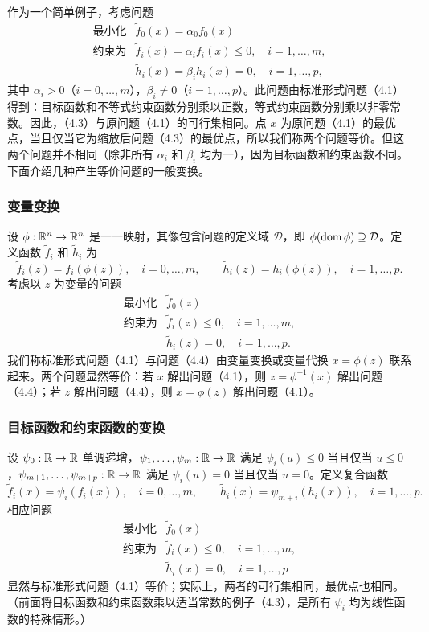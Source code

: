 作为一个简单例子，考虑问题
\begin{equation}
\begin{array}{ll}
\text{最小化}&\widetilde f_0(x)=\alpha_0f_0(x)\\
\text{约束为}&\widetilde f_i(x)=\alpha_if_i(x)\le0,\quad i=1,\ldots,m,\\
&\widetilde h_i(x)=\beta_ih_i(x)=0,\quad i=1,\ldots,p,
\end{array}\tag{4.3}
\end{equation}
其中 $\alpha_i>0$（$i=0,\ldots,m$），$\beta_i\ne0$（$i=1,\ldots,p$）。此问题由标准形式问题（4.1）得到：目标函数和不等式约束函数分别乘以正数，等式约束函数分别乘以非零常数。因此，（4.3）与原问题（4.1）的可行集相同。点 $x$ 为原问题（4.1）的最优点，当且仅当它为缩放后问题（4.3）的最优点，所以我们称两个问题等价。但这两个问题并不相同（除非所有 $\alpha_i$ 和 $\beta_i$ 均为一），因为目标函数和约束函数不同。下面介绍几种产生等价问题的一般变换。

\subsubsection*{变量变换}
设 $\phi:\mathbb R^n\to\mathbb R^n$ 是一一映射，其像包含问题的定义域 $\mathcal D$，即 $\phi(\operatorname{dom}\phi)\supseteq\mathcal D$。定义函数 $\widetilde f_i$ 和 $\widetilde h_i$ 为
\[
\widetilde f_i(z)=f_i(\phi(z)),\quad i=0,\ldots,m,\qquad
\widetilde h_i(z)=h_i(\phi(z)),\quad i=1,\ldots,p.
\]
考虑以 $z$ 为变量的问题
\begin{equation}
\begin{array}{ll}
\text{最小化}&\widetilde f_0(z)\\
\text{约束为}&\widetilde f_i(z)\le0,\quad i=1,\ldots,m,\\
&\widetilde h_i(z)=0,\quad i=1,\ldots,p.
\end{array}\tag{4.4}
\end{equation}
我们称标准形式问题（4.1）与问题（4.4）由变量变换或变量代换 $x=\phi(z)$ 联系起来。两个问题显然等价：若 $x$ 解出问题（4.1），则 $z=\phi^{-1}(x)$ 解出问题（4.4）；若 $z$ 解出问题（4.4），则 $x=\phi(z)$ 解出问题（4.1）。

\subsubsection*{目标函数和约束函数的变换}
设 $\psi_0:\mathbb R\to\mathbb R$ 单调递增，$\psi_1,\ldots,\psi_m:\mathbb R\to\mathbb R$ 满足 $\psi_i(u)\le0$ 当且仅当 $u\le0$，$\psi_{m+1},\ldots,\psi_{m+p}:\mathbb R\to\mathbb R$ 满足 $\psi_i(u)=0$ 当且仅当 $u=0$。定义复合函数
\[
\widetilde f_i(x)=\psi_i(f_i(x)),\quad i=0,\ldots,m,\qquad
\widetilde h_i(x)=\psi_{m+i}(h_i(x)),\quad i=1,\ldots,p.
\]
相应问题
\[
\begin{array}{ll}
\text{最小化}&\widetilde f_0(x)\\
\text{约束为}&\widetilde f_i(x)\le0,\quad i=1,\ldots,m,\\
&\widetilde h_i(x)=0,\quad i=1,\ldots,p
\end{array}
\]
显然与标准形式问题（4.1）等价；实际上，两者的可行集相同，最优点也相同。（前面将目标函数和约束函数乘以适当常数的例子（4.3），是所有 $\psi_i$ 均为线性函数的特殊情形。）

